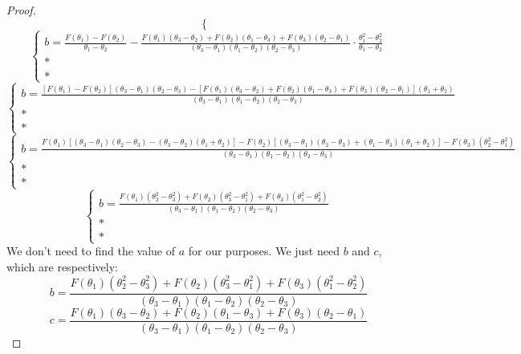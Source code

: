 \begin{proof}
\[\begin{cases}
        \end{cases}
    \]
    \[
        \begin{cases}
            b = \frac{F(\theta_1) - F(\theta_2)}{\theta_1 - \theta_2} - \frac{F(\theta_1)(\theta_3 - \theta_2) + F(\theta_2)(\theta_1 - \theta_3) + F(\theta_3)(\theta_2 - \theta_1)}{(\theta_3 - \theta_1)(\theta_1 - \theta_2)(\theta_2 - \theta_3)}\cdot\frac{\theta_1^2 - \theta_2^2}{\theta_1 - \theta_2} \\
            * \\
            *
        \end{cases}
    \]
    \[
        \begin{cases}
            b = \frac{[F(\theta_1) - F(\theta_2)](\theta_3 - \theta_1)(\theta_2 - \theta_3) - [F(\theta_1)(\theta_3 - \theta_2) + F(\theta_2)(\theta_1 - \theta_3) + F(\theta_3)(\theta_2 - \theta_1)](\theta_1 + \theta_2)}{(\theta_3 - \theta_1)(\theta_1 - \theta_2)(\theta_2 - \theta_3)} \\
            * \\
            *
        \end{cases}
    \]
    \[
        \begin{cases}
            b = \frac{F(\theta_1)[(\theta_3 - \theta_1)(\theta_2 - \theta_3) - (\theta_3 - \theta_2)(\theta_1 + \theta_2)] - F(\theta_2)[(\theta_3 - \theta_1)(\theta_2 - \theta_3) + (\theta_1 - \theta_3)(\theta_1 + \theta_2)] - F(\theta_3)(\theta_2^2 - \theta_1^2)}{(\theta_3 - \theta_1)(\theta_1 - \theta_2)(\theta_2 - \theta_3)} \\
            * \\
            *
        \end{cases}
    \]
    \[
        \begin{cases}
            b = \frac{F(\theta_1)(\theta_2^2 - \theta_3^2) + F(\theta_2)(\theta_3^2 - \theta_1^2) + F(\theta_3)(\theta_1^2 - \theta_2^2)}{(\theta_3 - \theta_1)(\theta_1 - \theta_2)(\theta_2 - \theta_3)} \\
            * \\
            *
        \end{cases}
    \]
    We don't need to find the value of \(a\) for our purposes. We just need \(b\) and \(c\), which are respectively:
    \[b = \frac{F(\theta_1)(\theta_2^2 - \theta_3^2) + F(\theta_2)(\theta_3^2 - \theta_1^2) + F(\theta_3)(\theta_1^2 - \theta_2^2)}{(\theta_3 - \theta_1)(\theta_1 - \theta_2)(\theta_2 - \theta_3)}\]
    \[c = \frac{F(\theta_1)(\theta_3 - \theta_2) + F(\theta_2)(\theta_1 - \theta_3) + F(\theta_3)(\theta_2 - \theta_1)}{(\theta_3 - \theta_1)(\theta_1 - \theta_2)(\theta_2 - \theta_3)}\]

\end{proof}
